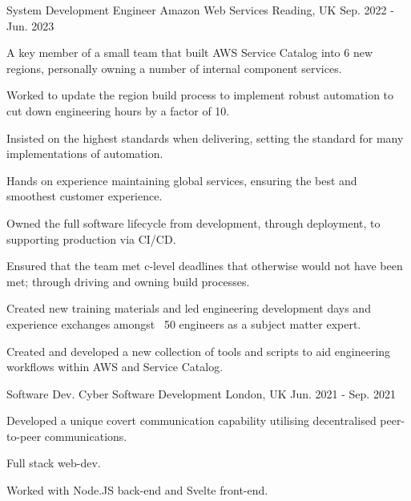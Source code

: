 \begin{cventries}
\cventry
{System Development Engineer} %
{Amazon Web Services} %
{Reading, UK} %
{Sep. 2022 - Jun. 2023} %
{ %
\begin{cvitems}\vspace{-4mm}
\item {A key member of a small team that built AWS Service Catalog into 6 new regions, personally owning a number of internal component services.}
\item {Worked to update the region build process to implement robust automation to cut down engineering hours by a factor of 10.}
\item {Insisted on the highest standards when delivering, setting the standard for many implementations of automation.}
\item {Hands on experience maintaining global services, ensuring the best and smoothest customer experience.}
\item {Owned the full software lifecycle from development, through deployment, to supporting production via CI/CD.}
\item {Ensured that the team met c-level deadlines that otherwise would not have been met; through driving and owning build processes.}
\item {Created new training materials and led engineering development days and experience exchanges amongst ~50 engineers as a subject matter expert.}
\item {Created and developed a new collection of tools and scripts to aid engineering workflows within AWS and Service Catalog.}
\vspace{4mm}\end{cvitems}
}


\cventry
{Software Dev.} %
{Cyber Software Development} %
{London, UK} %
{Jun. 2021 - Sep. 2021} %
{ %
\begin{cvitems}\vspace{-4mm}
\item {Developed a unique covert communication capability utilising decentralised peer-to-peer communications.}
\item {Full stack web-dev.}
\item {Worked with Node.JS back-end and Svelte front-end.}
\vspace{4mm}\end{cvitems}
}


\end{cventries}

